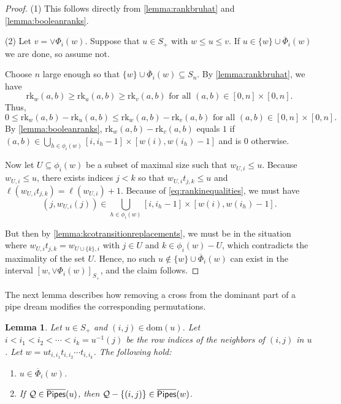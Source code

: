 \documentclass[12 pt]{amsart}
\newcommand{\rk}{\mathrm{rk}}
\newcommand{\dom}{\mathrm{dom}}
\newtheorem{lemma}[Theorem]{Lemma}
\numberwithin{equation}{section}
\theoremstyle{remark}
\newcommand{\kpipes}{\overline{\sf Pipes}}
\newcommand{\cotransitionperms}{\Phi}
\newcommand{\cotransitionindices}{\phi}
\newcommand{\kcotransitionperms}{\overline{\Phi}}
\begin{document}
		\begin{proof}
			\noindent (1) This follows directly from \cref{lemma:rankbruhat} and \cref{lemma:booleanranks}. 
			
			\noindent (2) Let $v = \vee \cotransitionperms_i(w)$. Suppose that $u \in S_{+} $ with $w\leq u \leq v$. If $u \in \{w\} \cup \kcotransitionperms_i(w)$ we are done, so assume not. 
			
			Choose $n$ large enough so that $\{w\} \cup \kcotransitionperms_i(w) \subseteq S_n$.
			By \cref{lemma:rankbruhat}, we have
			\[\rk_w(a,b)\geq \rk_u(a,b)\geq \rk_v(a,b) \text{ for all } (a,b) \in [0,n] \times [0,n].\]
			Thus,
			\begin{equation}
				\label{eq:rankinequalities}
				0\leq \rk_w(a,b)-\rk_u(a,b)\leq \rk_w(a,b)-\rk_v(a,b) \text{ for all } (a,b) \in [0,n] \times [0,n].
			\end{equation}
			By \cref{lemma:booleanranks}, $\rk_w(a,b)-\rk_v(a,b)$ equals $1$ if $(a,b) \in\bigcup_{h \in \cotransitionindices_i(w)}[i,i_h-1] \times [w(i),w(i_h)-1]$ and is $0$ otherwise.
			
			Now let $U \subseteq \cotransitionindices_{i}(w)$ be a subset of maximal size such that $w_{U,i}\leq u$. 
			Because $w_{U,i}\leq u$, there exists indices $j < k$ so that $w_{U,i} t_{j,k}\leq u$ and $\ell(w_{U,i} t_{j,k}) = \ell(w_{U,i}) + 1$. Because of \cref{eq:rankinequalities}, we must have \[(j,w_{U,i}(j)) \in\bigcup_{h \in \cotransitionindices_i(w)}[i,i_h-1] \times [w(i),w(i_h)-1].\]
			
			But then by \cref{lemma:kcotransitionreplacements}, we must be in the situation where $w_{U,i} t_{j,k} = w_{U \cup \{k\},i}$ with $j \in U$ and $k \in\cotransitionindices_i(w)-U$, which contradicts the maximality of the set $U$. Hence, no such \( u \notin \{w\} \cup \kcotransitionperms_i(w) \) can exist in the interval $[w,\vee \cotransitionperms_i(w)]_{S_{+}}$, and the claim follows.
		\end{proof}
		
		The next lemma describes how removing a cross from the dominant part of a pipe dream modifies the corresponding permutations.
		\begin{lemma}
			\label{lemma:dominantcrossremoval}
			Let $u \in S_+$ and $(i,j) \in \dom(u)$. 
			Let $i < i_1 < i_2 < \cdots < i_k = u^{-1}(j)$ be the row indices of the neighbors of $(i,j)$ in $u$. 
			Let $w = ut_{i,i_1}t_{i,i_2}\cdots t_{i,i_k}$. 
			The following hold:
			\begin{enumerate}
				\item $u \in \kcotransitionperms_{i}(w)$.
				\item If $\mathcal{Q} \in \kpipes(u)$, then $\mathcal{Q}-\{(i,j)\} \in \kpipes(w)$.
			\end{enumerate}
		\end{lemma}
		
\end{document}
